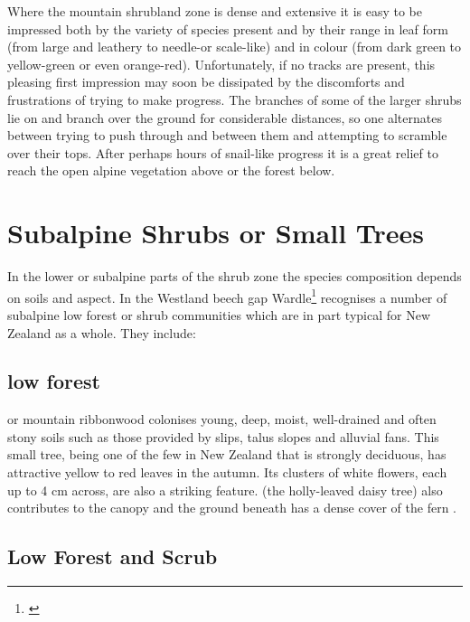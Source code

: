 Where the mountain shrubland zone is dense and extensive it is easy to be impressed both by the variety of species present and by their range in leaf form (from large and leathery to needle-or scale-like) and in colour (from dark green to yellow-green or even orange-red).
Unfortunately, if no tracks are present, this pleasing first impression may soon be dissipated by the discomforts and frustrations of trying to make progress.
The branches of some of the larger shrubs lie on and branch over the ground for considerable distances, so one alternates between trying to push through and between them and attempting to scramble over their tops.
After perhaps hours of snail-like progress it is a great relief to reach the open alpine vegetation above or the forest below.

\section{Subalpine Shrubs or Small Trees}

In the lower or subalpine parts of the shrub zone the species composition depends on soils and aspect.
In the Westland beech gap Wardle\footnote{\cite{wardle1977plant}} recognises a number of subalpine low forest or shrub communities which are in part typical for New Zealand as a whole.
They include:

\subsection[\emph{Hoheria glabrata} low forest]{ low forest}

 or mountain ribbonwood colonises young, deep, moist, well-drained and often stony soils such as those provided by slips, talus slopes and alluvial fans.
This small tree, being one of the few in New Zealand that is strongly deciduous, has attractive yellow to red leaves in the autumn.
Its clusters of white flowers, each up to 4 cm across, are also a striking feature.  (the holly-leaved daisy tree) also contributes to the canopy and the ground beneath has a dense cover of the fern .

\subsection[\emph{Dracophyllum-Olearia} Low Forest and Scrub]{ Low Forest and Scrub}

